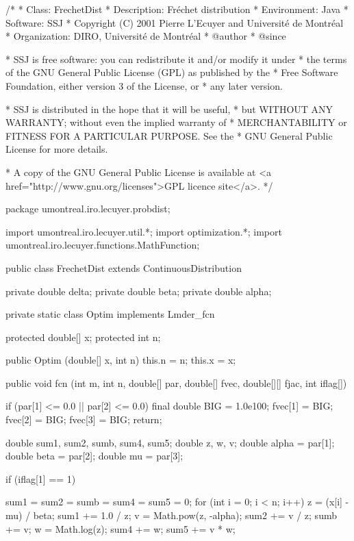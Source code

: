 \begin{code}
\begin{hide}
/*
 * Class:        FrechetDist
 * Description:  Fréchet distribution
 * Environment:  Java
 * Software:     SSJ 
 * Copyright (C) 2001  Pierre L'Ecuyer and Université de Montréal
 * Organization: DIRO, Université de Montréal
 * @author       
 * @since

 * SSJ is free software: you can redistribute it and/or modify it under
 * the terms of the GNU General Public License (GPL) as published by the
 * Free Software Foundation, either version 3 of the License, or
 * any later version.

 * SSJ is distributed in the hope that it will be useful,
 * but WITHOUT ANY WARRANTY; without even the implied warranty of
 * MERCHANTABILITY or FITNESS FOR A PARTICULAR PURPOSE.  See the
 * GNU General Public License for more details.

 * A copy of the GNU General Public License is available at
   <a href="http://www.gnu.org/licenses">GPL licence site</a>.
 */
\end{hide}
package umontreal.iro.lecuyer.probdist;
\begin{hide}
import umontreal.iro.lecuyer.util.*;
import optimization.*;
import umontreal.iro.lecuyer.functions.MathFunction;
\end{hide}
public class FrechetDist extends ContinuousDistribution\begin{hide} {
   private double delta;
   private double beta;
   private double alpha;


   private static class Optim implements Lmder_fcn {
      protected double[] x;
      protected int n;

      public Optim (double[] x, int n) {
         this.n = n;
         this.x = x;
      }

      public void fcn (int m, int n, double[] par, double[] fvec, double[][] fjac, int iflag[])
      {
         if (par[1] <= 0.0 || par[2] <= 0.0) {
            final double BIG = 1.0e100;
            fvec[1] = BIG;
            fvec[2] = BIG;
            fvec[3] = BIG;
            return;
         }

         double sum1, sum2, sumb, sum4, sum5;
         double z, w, v;
         double alpha = par[1];
         double beta = par[2];
         double mu = par[3];

         if (iflag[1] == 1) {
            sum1 = sum2 = sumb = sum4 = sum5 = 0;
            for (int i = 0; i < n; i++) {
               z = (x[i] - mu) / beta;
               sum1 += 1.0 / z;
               v = Math.pow(z, -alpha);
               sum2 += v / z;
               sumb += v;
               w = Math.log(z);
               sum4 += w;
               sum5 += v * w;
            }

}}}}
\end{hide}
\end{code}
